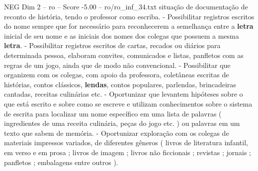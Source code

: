 \begin{textsample}{NEG Dim 2 – ro – Score -5.00 – ro/ro\_inf\_34.txt}
situação de documentação de reconto de história, tendo o professor como escriba. - Possibilitar registros escritos do nome sempre que for necessário para reconhecerem a semelhança entre a \textbf{letra} inicial de seu nome e as iniciais dos nomes dos colegas que possuem a mesma \textbf{letra}. - Possibilitar registros escritos de cartas, recados ou diários para determinada pessoa, elaboram convites, comunicados e listas, panfletos com as regras de um jogo, ainda que de modo não convencional. - Possibilitar que organizem com os colegas, com apoio da professora, coletâneas escritas de histórias, contos clássicos, \textbf{lendas}, contos populares, parlendas, brincadeiras cantadas, receitas culinárias etc. - Oportunizar que levantem hipóteses sobre o que está escrito e sobre como se escreve e utilizam conhecimentos sobre o sistema de escrita para localizar um nome específico em uma lista de palavras ( ingredientes de uma receita culinária, peças do jogo etc. ) ou palavras em um texto que sabem de memória. - Oportunizar exploração com os colegas de materiais impressos variados, de diferentes gêneros ( livros de literatura infantil, em verso e em prosa ; livros de imagem ; livros não ficcionais ; revistas ; jornais ; panfletos ; embalagens entre outros ).

\end{textsample}
